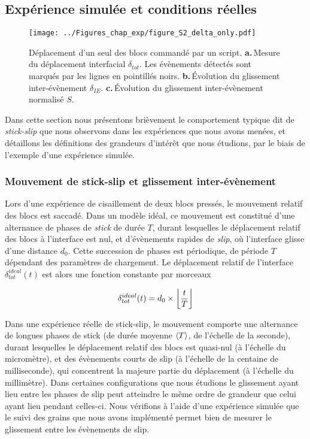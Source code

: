 \subsection{Expérience simulée et conditions réelles}
\label{sec:obsoptique}


\begin{figure}[htb]
\texttt{[image: ../Figures\_chap\_exp/figure\_S2\_delta\_only.pdf]}
\caption[Définition de $\delta_{IE}$ et $S$]{Déplacement d'un seul des blocs commandé par un script. \textbf{a.}\,Mesure du déplacement interfacial $\delta_{tot}$. Les évènements détectés sont marqués par les lignes en pointillés noirs. \textbf{b.}\,Évolution du glissement inter-évènement $\delta_{IE}$. \textbf{c.}\,Évolution du glissement inter-évènement normalisé $S$.}
\label{fig:delta}
\end{figure}


Dans cette section nous présentons brièvement le comportement typique dit de \textit{stick-slip} que nous observons dans les expériences que nous avons menées, et détaillons les définitions des grandeurs d'intérêt que nous étudions, par le biais de l'exemple d'une expérience simulée.

\subsubsection{Mouvement de stick-slip et glissement inter-évènement}
Lors d'une expérience de cisaillement de deux blocs pressés, le mouvement relatif des blocs est saccadé. Dans un modèle idéal, ce mouvement est constitué d'une alternance de phases de \textit{stick} de durée $T$, durant lesquelles le déplacement relatif des blocs à l'interface est nul, et d'évènements rapides de \textit{slip}, où l'interface glisse d'une distance $d_0$. Cette succession de phases est périodique, de période $T$ dépendant des paramètres de chargement. Le déplacement relatif de l'interface $\delta_{tot}^{ideal}(t)$ est alors une fonction constante par morceaux

\begin{equation}
\delta_{tot}^{ideal}(t)= d_0\times\left\lfloor {\frac{t}{T}} \right\rfloor
\end{equation}

Dans une expérience réelle de stick-slip, le mouvement comporte une alternance de longues phases de stick (de durée moyenne $\left\langle {T} \right\rangle$, de l'échelle de la seconde), durant lesquelles le déplacement relatif des blocs est quasi-nul (à l'échelle du micromètre), et des évènements courts de slip (à l'échelle de la centaine de milliseconde), qui concentrent la majeure partie du déplacement (à l'échelle du millimètre). Dans certaines configurations que nous étudions le glissement ayant lieu entre les phases de slip peut atteindre le même ordre de grandeur que celui ayant lieu pendant celles-ci. Nous vérifions à l'aide d'une expérience simulée que le suivi des grains que nous avons implémenté permet bien de mesurer le glissement entre les évènements de slip.


